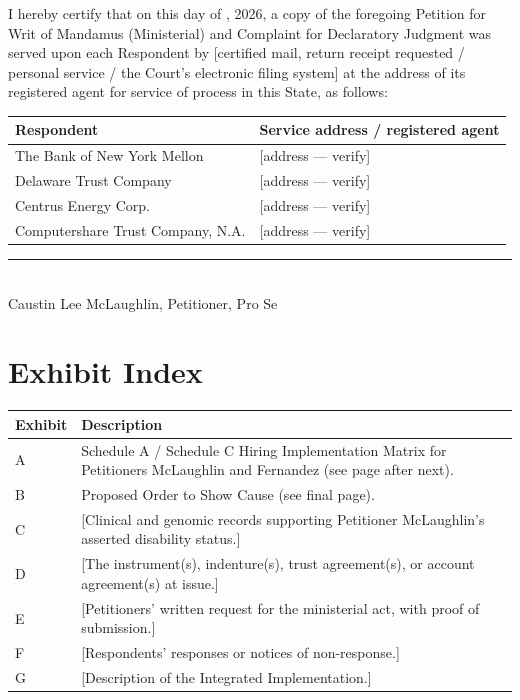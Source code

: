 \documentclass[12pt,letterpaper]{article}
\begin{document}
I hereby certify that on this \underline{\hspace{0.4in}} day of
\underline{\hspace{1.4in}}, 2026, a copy of the foregoing Petition for Writ of
Mandamus (Ministerial) and Complaint for Declaratory Judgment was served upon
each Respondent by [certified mail, return receipt requested / personal service
/ the Court's electronic filing system] at the address of its registered agent
for service of process in this State, as follows:

\vspace{0.15in}
\noindent
\begin{tabularx}{\textwidth}{@{}p{2.4in}X@{}}
\toprule
Respondent & Service address / registered agent\\
\midrule
The Bank of New York Mellon & [address --- verify]\\
Delaware Trust Company & [address --- verify]\\
Centrus Energy Corp. & [address --- verify]\\
Computershare Trust Company, N.A. & [address --- verify]\\
\bottomrule
\end{tabularx}

\vspace{0.3in}
\noindent\rule{2.8in}{0.4pt}\\
Caustin Lee McLaughlin, Petitioner, Pro Se

\section*{Exhibit Index}

\begin{longtable}{@{}p{0.9in}p{5.3in}@{}}
\toprule
Exhibit & Description\\
\midrule
\endhead
A & Schedule A / Schedule C Hiring Implementation Matrix for Petitioners
McLaughlin and Fernandez (see page after next).\\
B & Proposed Order to Show Cause (see final page).\\
C & [Clinical and genomic records supporting Petitioner McLaughlin's asserted
disability status.]\\
D & [The instrument(s), indenture(s), trust agreement(s), or account
agreement(s) at issue.]\\
E & [Petitioners' written request for the ministerial act, with proof of
submission.]\\
F & [Respondents' responses or notices of non-response.]\\
G & [Description of the Integrated Implementation.]\\
\bottomrule
\end{longtable}
\end{document}
